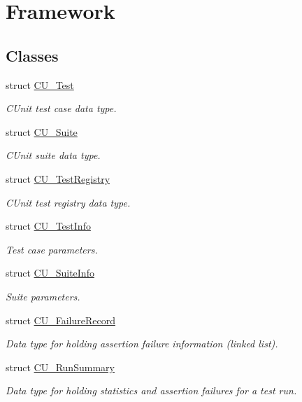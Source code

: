 \hypertarget{group___framework}{\section{Framework}
\label{group___framework}
}
\subsection*{Classes}
\begin{DoxyCompactItemize}
\item 
struct \hyperlink{struct_c_u___test}{C\+U\+\_\+\+Test}
\begin{DoxyCompactList}\small\item\em C\+Unit test case data type. \end{DoxyCompactList}\item 
struct \hyperlink{struct_c_u___suite}{C\+U\+\_\+\+Suite}
\begin{DoxyCompactList}\small\item\em C\+Unit suite data type. \end{DoxyCompactList}\item 
struct \hyperlink{struct_c_u___test_registry}{C\+U\+\_\+\+Test\+Registry}
\begin{DoxyCompactList}\small\item\em C\+Unit test registry data type. \end{DoxyCompactList}\item 
struct \hyperlink{struct_c_u___test_info}{C\+U\+\_\+\+Test\+Info}
\begin{DoxyCompactList}\small\item\em Test case parameters. \end{DoxyCompactList}\item 
struct \hyperlink{struct_c_u___suite_info}{C\+U\+\_\+\+Suite\+Info}
\begin{DoxyCompactList}\small\item\em Suite parameters. \end{DoxyCompactList}\item 
struct \hyperlink{struct_c_u___failure_record}{C\+U\+\_\+\+Failure\+Record}
\begin{DoxyCompactList}\small\item\em Data type for holding assertion failure information (linked list). \end{DoxyCompactList}\item 
struct \hyperlink{struct_c_u___run_summary}{C\+U\+\_\+\+Run\+Summary}
\begin{DoxyCompactList}\small\item\em Data type for holding statistics and assertion failures for a test run. \end{DoxyCompactList}\end{DoxyCompactItemize}
